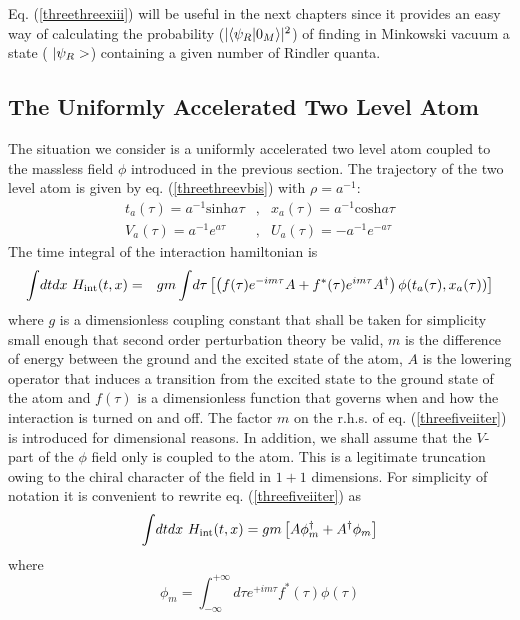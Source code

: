 Eq. (\ref{threethreexiii}) will be  useful in the next chapters since
it provides an easy way of calculating the probability ($\vert \mbox{$ \langle \psi_R
\vert 0_M \rangle $} \vert^2$) of
finding in Minkowski vacuum a state ( $\mbox{$ \vert \psi_R > $}$) containing a given number
of
Rindler quanta.

\subsection{The Uniformly Accelerated Two Level Atom}

The situation we consider is a uniformly accelerated two level atom coupled
to the massless field $\phi$ introduced in the previous section.
The trajectory of the two level atom is
given by eq. (\ref{threethreevbis}) with $\rho =a^{-1}$:
\begin{eqnarray} t_a (\tau) =a^{-1}
\mbox{sinh} a \tau & ,&  x_a (\tau) =a^{-1} \mbox{cosh} a \tau
\nonumber\\
V_a (\tau) = a^{-1} e^{a\tau} & ,& U_a (\tau) = -a^{-1} e^{-a\tau}
\label{threefivexiibis}
\end{eqnarray}
The time integral of the interaction hamiltonian is
\begin{eqnarray} \int\! dt dx\ H_{\rm int} (t,x) &=& g m \int\!
d\tau \left[ \left( f(\tau) e^{-im\tau} A  +
f^*(\tau) e^{im\tau} A^{\dagger}
\right) \phi(t_a(\tau),x_a (\tau)) \right]
\label{threefiveiiter} \end{eqnarray}
where $g$ is a dimensionless coupling constant that shall be
taken for simplicity  small enough that second order perturbation theory be
valid, $m$ is the difference of energy between the ground and the
excited state
of the atom,
$A$ is the lowering operator that induces a transition
 from the excited state to the
ground state of the atom
and $f(\tau)$ is a dimensionless function that governs when and how the
interaction
is turned on and off. The factor $m$ on the r.h.s. of eq.
(\ref{threefiveiiter})  is
introduced for dimensional reasons.
In addition, we shall assume that the $V$-part of the $\phi$ field only
is coupled to the atom. This is a legitimate truncation owing to the
chiral character of the field in $1+1$ dimensions.
For simplicity of notation it is convenient to rewrite
eq. (\ref{threefiveiiter})
 as
\begin{eqnarray} \int\! dt dx\ H_{\rm int} (t,x) =
 g m  \left[ A \phi_m^\dagger  +  A^\dagger \phi_m
\right] \label{threefiveii} \end{eqnarray} where
\begin{equation} \phi_m = \int_{-\infty}^{+\infty}\!
d\tau e^{+im\tau} f^*(\tau) \phi(\tau) \label{threefiveiii} \end{equation}


